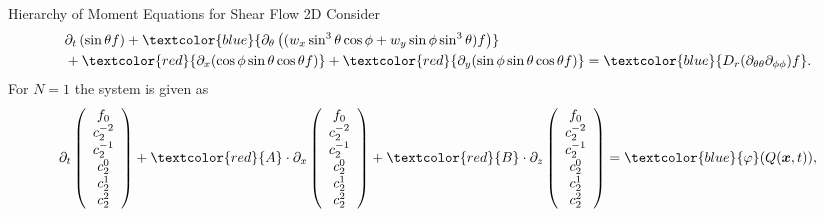 \begin{frame}{Hierarchy of Moment Equations for Shear Flow 2D}
	\scriptsize
Consider
\begin{align*}
	&\partial_{t}\left(\sin \theta f\right)+ \textcolor{blue}{\partial_\theta\left(( w_x \sin^3 \theta \cos \phi + w_y\sin \phi \sin^3 \theta) f\right)}\\
&+\textcolor{red}{\partial_x(\cos\phi \sin\theta \cos\theta f)} + \textcolor{red}{\partial_y(\sin \phi \sin \theta \cos \theta f )}
= \textcolor{blue}{D_{r}(\partial_{\theta\theta}\partial_{\phi\phi})f}.
\end{align*}
	For $N=1$ the system is given as
	\begin{equation}
		\partial_t \left(\begin{array}{c}
			f_0 \\
			c_2^{-2} \\
			c_2^{-1} \\
			c_2^0 \\
			c_2^1 \\
			c_2^2
		\end{array}\right) + \textcolor{red}{A} \cdot \partial_x
		\left(\begin{array}{c}
			f_0 \\
			c_2^{-2} \\
			c_2^{-1} \\
			c_2^0 \\
			c_2^1 \\
			c_2^2
		\end{array}\right) + \textcolor{red}{B} \cdot \partial_z \left(\begin{array}{c}
			f_0 \\
			c_2^{-2} \\
			c_2^{-1} \\
			c_2^0 \\
			c_2^1 \\
			c_2^2
		\end{array}\right) =  \textcolor{blue}{\varphi} (Q(\boldsymbol{x},t)),
	\end{equation}
\end{frame}

